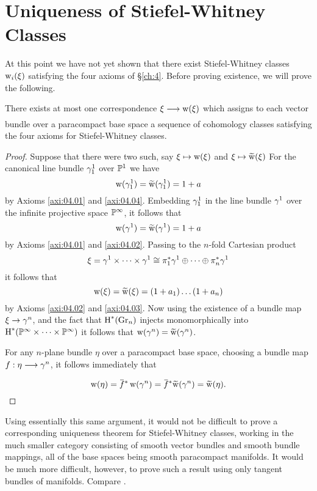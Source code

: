 \documentclass[../main]{subfiles}
\begin{document}
\section{Uniqueness of Stiefel-Whitney Classes}

At this point we have not yet shown that there exist Stiefel-Whitney classes $\operatorname{w}_{i}(\xi)$ satisfying the four axioms of \S\ref{ch:4}. Before proving existence, we will prove the following.


\begin{theorem}
\label{thm:07.03}
There exists at most one correspondence $\xi \varrightarrow{} \sw(\xi)$ which assigns to each vector bundle over a paracompact base space a sequence of cohomology classes satisfying the four axioms for Stiefel-Whitney classes.
\end{theorem}
\begin{proof}
	Suppose that there were two such, say $\xi \mapsto \operatorname{w}(\xi)$ and $\xi \mapsto \xtilde{\sw}(\xi)$ For the canonical line bundle $\gamma_{1}^{1}$ over $\mathbb{P}^{1}$ we have
	\[
	\sw(\tautological_{1}^{1})=\xtilde{\sw}(\tautological_{1}^{1})=1+a
	\]
	by Axioms \ref{axi:04.01} and \ref{axi:04.04}. Embedding $\gamma_{1}^{1}$ in the line bundle $\gamma^{1}$ over the infinite projective space $\mathbb{P}^{\infty}$, it follows that
	\[
	\sw(\tautological^{1})=\xtilde{\sw}(\tautological^{1})=1+a
	\]
	by Axioms \ref{axi:04.01} and \ref{axi:04.02}. Passing to the $n$-fold Cartesian product
	\[
	\xi=\gamma^{1} \times \dots \times \gamma^{1} \cong \pi_{1}^{*} \gamma^{1} \oplus \dots \oplus \pi_{n}^{*} \gamma^{1}
	\]
	it follows that
	\[
	\sw(\xi)=\xtilde{\sw}(\xi)=(1+a_{1}) \dots(1+a_{n})
	\]
	by Axioms \ref{axi:04.02} and \ref{axi:04.03}. Now using the existence of a bundle map $\xi \rightarrow \gamma^{n}$, and the fact that $\operatorname{H}^{*}(\operatorname{Gr}_n)$ injects monomorphically into $\operatorname{H}^{*}(\mathbb{P}^{\infty} \times \dots \times \mathbb{P}^{\infty})$ it follows that $\sw(\tautological^{n})=\xtilde{\sw}(\tautological^{n})$.
	
	For any $n$-plane bundle $\eta$ over a paracompact base space, choosing a bundle map $f:\eta\varrightarrow{} \tautological^n$, it follows immediately that
	\[
	\sw(\eta)=\xoverline{f}^{*} \sw(\tautological^{n})=\xoverline{f}^{*} \xtilde{\sw}(\tautological^{n})=\xtilde{\sw}(\eta).\qedhere
	\]
\end{proof}
\begin{remark*}
	Using essentially this same argument, it would not be difficult to prove a corresponding uniqueness theorem for Stiefel-Whitney classes, working in the much smaller category consisting of smooth vector bundles and smooth bundle mappings, all of the base spaces being smooth paracompact manifolds. It would be much more difficult, however, to prove such a result using only tangent bundles of manifolds. Compare \cite{blantonaxiom}.
\end{remark*}
\end{document}
